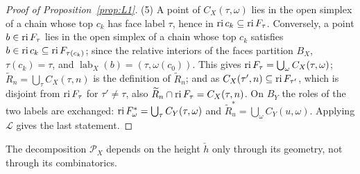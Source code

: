 \begin{proof}[Proof of Proposition~\ref{prop:L1}]
(5) A point of $C_X(\tau,\omega)$ lies in the open simplex of a chain whose top $c_k$ has face label $\tau$, hence in
$\operatorname{ri} c_k\subseteq\operatorname{ri} F_\tau$. Conversely, a point $b\in\operatorname{ri} F_\tau$ lies in the open simplex of a chain whose top
$c_k$ satisfies $b\in\operatorname{ri} c_k\subseteq\operatorname{ri} F_{\tau(c_k)}$; since the relative interiors of the faces partition $B_X$,
$\tau(c_k)=\tau$, and $\operatorname{lab}_X(b)=(\tau,\omega(c_0))$. This gives $\operatorname{ri} F_\tau=\bigcup_\omega C_X(\tau,\omega)$;
$\widetilde R_n=\bigcup_\tau C_X(\tau,n)$ is the definition of $\widetilde R_n$; and as $C_X(\tau',n)\subseteq\operatorname{ri}
F_{\tau'}$, which is disjoint from $\operatorname{ri} F_\tau$ for $\tau'\ne\tau$, also $\widetilde R_n\cap\operatorname{ri} F_\tau=C_X(\tau,n)$.
On $B_Y$ the roles of the two labels are exchanged: $\operatorname{ri} F^*_\omega=\bigcup_\tau C_Y(\tau,\omega)$ and
$\widetilde R^*_u=\bigcup_\omega C_Y(u,\omega)$. Applying $\mathcal L$ gives the last statement.
\end{proof}

The decomposition $\mathscr P_X$ depends on the height $\check h$ only through its geometry, not through its combinatorics.

